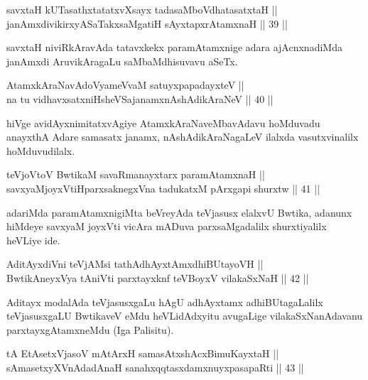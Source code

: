 \begin{shl}
savxtaH kUTasathxtatatxvXsayx tadasaMboVdhatasatxtaH || \\
janAmxdivikirxyASaTakxsaMgatiH sAyxtapxrAtamxnaH \hfill || 39 ||  
\end{shl}

\begin{artha}
savxtaH niviRkAravAda tatavxkekx paramAtamxnige adara ajAcnxnadiMda
janAmxdi AruvikAragaLu saMbaMdhisuvavu aSeTx.
\end{artha}

\begin{shl}
AtamxkAraNavAdoV\s yameVvaM satuyxpapadayxteV || \\
na tu vidhavxsatxniHsheVSajanamxnAshAdikAraNeV \hfill || 40 ||  
\end{shl}

\begin{artha}
hiVge avidAyxnimitatxvAgiye AtamxkAraNaveMbavAdavu hoMduvadu anayxthA
Adare samasatx janamx, nAshAdikAraNagaLeV ilalxda vasutxvinalilx
hoMduvudilalx.
\end{artha}


\begin{shl}
teVjoV\s toV BwtikaM savaRmanayxtarx paramAtamxnaH || \\
savxyaMjoyxVtiHparxsaknegxVna tadukatxM pArxgapi shurxtw \hfill || 41 ||  
\end{shl}

\begin{artha}
adariMda paramAtamxnigiMta beVreyAda teVjasusx elalxvU Bwtika, adanunx
hiMdeye savxyaM joyxVti vicAra mADuva parxsaMgadalilx shurxtiyalilx
heVLiye ide.
\end{artha}

\begin{shl}
AditAyxdiVni teVjAMsi tathA\s dhAyxtAmxdhiBUtayoVH || \\
BwtikAneyxVya tAniVti parxtayxknf teVBoyxV vilakaSxNaH \hfill || 42 ||  
\end{shl}

\begin{artha}
Aditayx modalAda teVjasusxgaLu hAgU adhAyxtamx adhiBUtagaLalilx
teVjasusxgaLU BwtikaveV eMdu heVLidAdxyitu avugaLige
vilakaSxNanAdavanu parxtayxgAtamxneMdu (Iga Palisitu).
\end{artha}

\begin{shl}
tA EtAsetxVjasoV mAtArxH samasAtxshAcx\s \s BimuKayxtaH || \\
sAmasetxyXVnA\s \s dadAnaH sanahxqqtasxdamxnuyxpasapaRti \hfill || 43 ||  
\end{shl}

